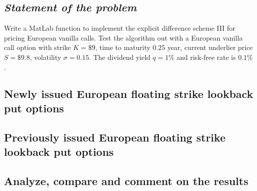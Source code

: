 \subsection*{\emph{Statement of the problem}}
Write a MatLab function to implement the explicit difference scheme III for pricing European vanilla calls. Test the algorithm out with a European vanilla call option with strike $K = \$9$, time to maturity $0.25$ year, current underlier price $S = \$9.8$, volatility $\sigma=0.15$. The dividend yield $q = 1\%$ and risk-free rate is $0.1\%$.

\subsection{Newly issued European floating strike lookback put options}

\subsection{Previously issued European floating strike lookback put options}

\subsection{Analyze, compare and comment on the results}

